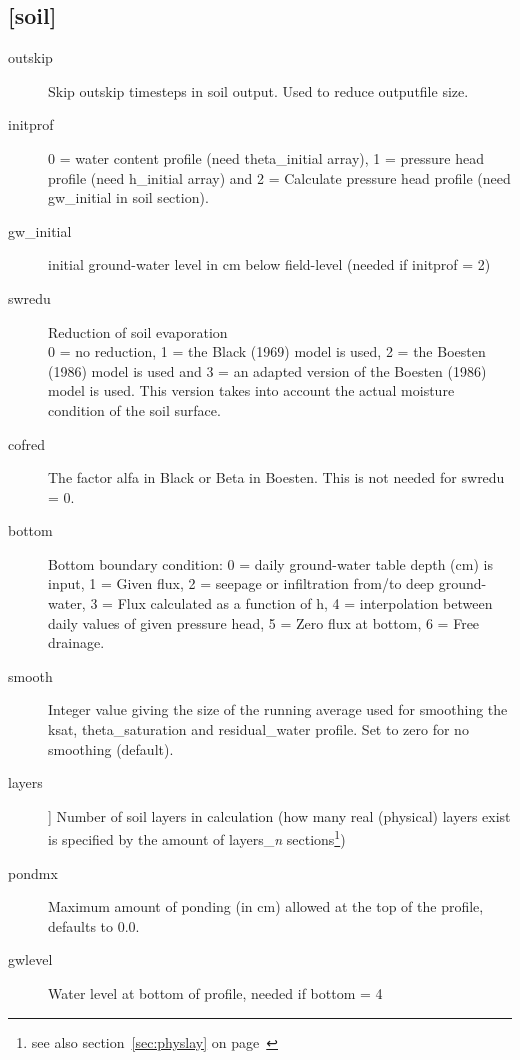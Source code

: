 \subsection{[soil]}\label{section:soil}
\begin{description}
\item[outskip]
Skip outskip timesteps in soil output. Used to reduce
outputfile size.

\item[initprof]
0 = water content profile (need theta\_initial array),
1 = pressure head profile (need h\_initial array) and
2 = Calculate pressure head profile (need gw\_initial in soil section).

\item[gw\_initial]
initial ground-water level in cm below field-level (needed if 
initprof = 2)

\item[swredu]
Reduction of soil evaporation \\
0 = no reduction, 1 = the Black (1969) model is used,
2 = the Boesten (1986) model is used and
3 = an adapted version of the Boesten (1986) model is used. 
This version takes into
account the actual moisture condition of the soil surface.

\item[cofred]
The factor alfa in Black or Beta in Boesten. This is not needed for
swredu = 0.  
\item[bottom]
Bottom boundary condition:
0 = daily ground-water table depth (cm) is input,
1 = Given flux,
2 = seepage or infiltration from/to deep ground-water,
3 = Flux calculated as a function of h,
4 = interpolation between daily values of given pressure head,
5 = Zero flux at bottom,
6 = Free drainage.

\item[smooth]
Integer value giving the size of the running average used for smoothing 
the ksat, theta\_saturation and residual\_water profile. 
Set to zero for no smoothing (default).

\item[layers]]
Number of soil layers in calculation (how many real (physical) layers
exist is specified by the amount of layers\_{\em n} sections\footnote{
see also section~\ref{sec:physlay} on page~\pageref{sec:physlay}})

\item[pondmx]
Maximum amount of ponding (in cm) allowed at the top of the profile,
defaults to 0.0.

\item[gwlevel]
Water level at bottom of profile, needed
if bottom = 4 


\end{description}
